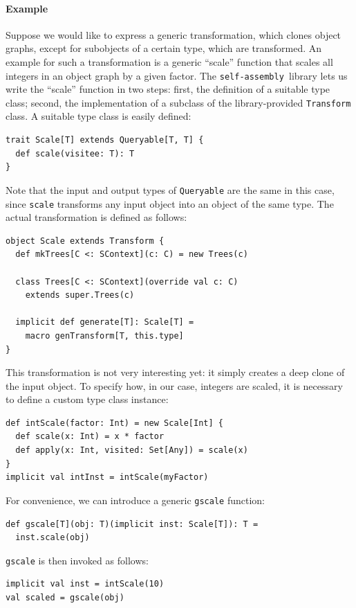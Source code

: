 \documentclass[preprint,nocopyrightspace]{sigplanconf}
\newcommand{\selfassembly}{\texttt{self-assembly~}}
\begin{document}

\paragraph{Example}
Suppose we would like to express a generic transformation,
which clones object graphs, except for subobjects of a certain type, which
are transformed. An example for such a transformation is a generic ``scale''
function that scales all integers in an object graph by a given factor.
The \selfassembly library lets us write the ``scale'' function in two steps:
first, the definition of a suitable type class; second, the implementation of
a subclass of the library-provided \verb|Transform| class. A suitable type
class is easily defined:
\begin{lstlisting}
trait Scale[T] extends Queryable[T, T] {
  def scale(visitee: T): T
}
\end{lstlisting}
\noindent
Note that the input and output types of \verb|Queryable| are the same in this
case, since \verb|scale| transforms any input object into an
object of the same type. The actual transformation is defined as follows:
\begin{lstlisting}
object Scale extends Transform {
  def mkTrees[C <: SContext](c: C) = new Trees(c)

  class Trees[C <: SContext](override val c: C)
    extends super.Trees(c)

  implicit def generate[T]: Scale[T] =
    macro genTransform[T, this.type]
}
\end{lstlisting}
\noindent
This transformation is not very interesting yet: it simply creates a deep
clone of the input object. To specify how, in our case, integers are scaled,
it is necessary to define a custom type class instance:
\begin{lstlisting}
def intScale(factor: Int) = new Scale[Int] {
  def scale(x: Int) = x * factor
  def apply(x: Int, visited: Set[Any]) = scale(x)
}
implicit val intInst = intScale(myFactor)
\end{lstlisting}
\noindent
For convenience, we can introduce a generic \verb|gscale| function:

\begin{lstlisting}
def gscale[T](obj: T)(implicit inst: Scale[T]): T =
  inst.scale(obj)
\end{lstlisting}
\noindent
\verb|gscale| is then invoked as follows:
\begin{lstlisting}
implicit val inst = intScale(10)
val scaled = gscale(obj)
\end{lstlisting}
\end{document}
